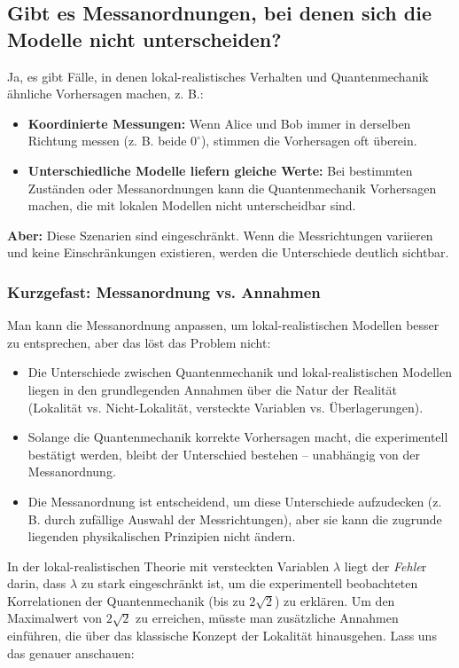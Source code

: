 \documentclass[12pt,a4paper]{article}
\begin{document}
	
	
	
	
	
	\subsection{Gibt es Messanordnungen, bei denen sich die Modelle nicht unterscheiden?}
	Ja, es gibt Fälle, in denen lokal-realistisches Verhalten und Quantenmechanik ähnliche Vorhersagen machen, z. B.:
	\begin{itemize}
		\item \textbf{Koordinierte Messungen:} Wenn Alice und Bob immer in derselben Richtung messen (z. B. beide $0^\circ$), stimmen die Vorhersagen oft überein.
		\item \textbf{Unterschiedliche Modelle liefern gleiche Werte:} Bei bestimmten Zuständen oder Messanordnungen kann die Quantenmechanik Vorhersagen machen, die mit lokalen Modellen nicht unterscheidbar sind.
	\end{itemize}
	\textbf{Aber:} Diese Szenarien sind eingeschränkt. Wenn die Messrichtungen variieren und keine Einschränkungen existieren, werden die Unterschiede deutlich sichtbar.
	
	\subsubsection{Kurzgefast: Messanordnung vs. Annahmen}
	Man kann die Messanordnung anpassen, um lokal-realistischen Modellen besser zu entsprechen, aber das löst das Problem nicht:
	\begin{itemize}
		\item Die Unterschiede zwischen Quantenmechanik und lokal-realistischen Modellen liegen in den grundlegenden Annahmen über die Natur der Realität (Lokalität vs. Nicht-Lokalität, versteckte Variablen vs. Überlagerungen).
		\item Solange die Quantenmechanik korrekte Vorhersagen macht, die experimentell bestätigt werden, bleibt der Unterschied bestehen – unabhängig von der Messanordnung.
		\item Die Messanordnung ist entscheidend, um diese Unterschiede aufzudecken (z. B. durch zufällige Auswahl der Messrichtungen), aber sie kann die zugrunde liegenden physikalischen Prinzipien nicht ändern.
	\end{itemize}
	
	In der lokal-realistischen Theorie mit versteckten Variablen $\lambda$ liegt der \textit{Fehle}r darin, dass $\lambda$ zu stark eingeschränkt ist, um die experimentell beobachteten Korrelationen der Quantenmechanik (bis zu $2\sqrt{2}$) zu erklären. Um den Maximalwert von $2\sqrt{2}$ zu erreichen, müsste man zusätzliche Annahmen einführen, die über das klassische Konzept der Lokalität hinausgehen. Lass uns das genauer anschauen:
	
\end{document}
